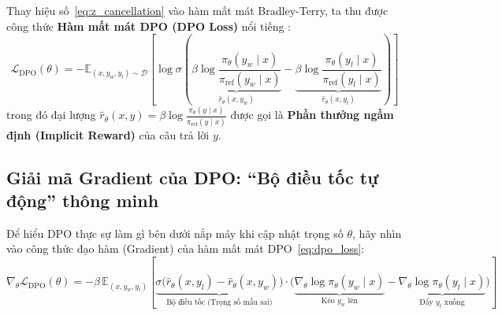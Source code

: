 Thay hiệu số~\eqref{eq:z_cancellation} vào hàm mất mát Bradley-Terry, ta thu được công thức \textbf{Hàm mất mát DPO (DPO Loss)} nổi tiếng \citep{rafailov2023direct}:
\begin{equation}
  \mathcal{L}_{\text{DPO}}(\theta) = -\mathbb{E}_{(x, y_w, y_l) \sim \mathcal{D}} \left[ \log \sigma \left( \underbrace{\beta \log \frac{\pi_\theta(y_w \mid x)}{\pi_{\text{ref}}(y_w \mid x)}}_{\hat{r}_\theta(x, y_w)} - \underbrace{\beta \log \frac{\pi_\theta(y_l \mid x)}{\pi_{\text{ref}}(y_l \mid x)}}_{\hat{r}_\theta(x, y_l)} \right) \right]
  \label{eq:dpo_loss}
\end{equation}
trong đó đại lượng $\hat{r}_\theta(x, y) = \beta \log \frac{\pi_\theta(y \mid x)}{\pi_{\text{ref}}(y \mid x)}$ được gọi là \textbf{Phần thưởng ngầm định (Implicit Reward)} của câu trả lời $y$.

\subsection{Giải mã Gradient của DPO: ``Bộ điều tốc tự động'' thông minh}

Để hiểu DPO thực sự làm gì bên dưới nắp máy khi cập nhật trọng số $\theta$, hãy nhìn vào công thức đạo hàm (Gradient) của hàm mất mát DPO~\eqref{eq:dpo_loss}:
\begin{equation}
  \nabla_\theta \mathcal{L}_{\text{DPO}}(\theta) = -\beta \, \mathbb{E}_{(x, y_w, y_l)} \left[ \underbrace{\sigma\big(\hat{r}_\theta(x, y_l) - \hat{r}_\theta(x, y_w)\big)}_{\text{Bộ điều tốc (Trọng số mẫu sai)}} \cdot \Big( \underbrace{\nabla_\theta \log \pi_\theta(y_w \mid x)}_{\text{Kéo } y_w \text{ lên}} - \underbrace{\nabla_\theta \log \pi_\theta(y_l \mid x)}_{\text{Đẩy } y_l \text{ xuống}} \Big) \right]
  \label{eq:dpo_gradient}
\end{equation}

